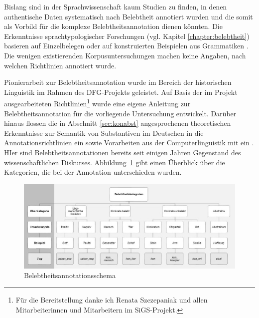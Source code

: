 
Bislang sind in der Sprachwissenschaft kaum Studien zu finden, in denen authentische Daten systematisch nach Belebtheit annotiert wurden und die somit als Vorbild für die komplexe  Belebtheitsannotation dienen könnten. Die Erkenntnisse sprachtypologischer Forschungen (vgl. Kapitel \ref{chapter:belebtheit}) basieren auf Einzelbelegen oder auf konstruierten Beispielen aus Grammatiken \parencite[z.B.][]{Comrie1989,Corbett2000,Aissen2003}. Die wenigen existierenden Korpusuntersuchungen  \parencite{Dahl1996,Yamamoto1999} machen keine Angaben, nach welchen Richtlinien annotiert wurde.

Pionierarbeit zur Belebtheitsannotation wurde im Bereich der historischen Linguistik im Rahmen des DFG-Projekts  \parencite[vgl.][]{Szczepaniak2016} geleistet. Auf Basis der im Projekt ausgearbeiteten Richtlinien\footnote{Für die Bereitstellung danke ich Renata Szczepaniak und allen Mitarbeiterinnen und Mitarbeitern im SiGS-Projekt.} wurde eine eigene Anleitung zur Belebtheitsannotation für die vorliegende Untersuchung entwickelt. Darüber hinaus flossen die in Abschnitt \ref{sec:konabst} angesprochenen theoretischen Erkenntnisse zur Semantik von Substantiven im Deutschen \parencite[u.a.][]{Ewald1992,Studler2011} in die Annotationsrichtlinien ein sowie  Vorarbeiten aus der Computerlinguistik mit ein \parencite[vgl.][]{Garretson2004,Zaenen2004,Ovrelid2009}. HIer sind Belebtheitsannotationen bereits seit einigen Jahren Gegenstand des wissenschaftlichen Diskurses. Abbildung~\ref{abb:belebtheitsannotationsschema} gibt einen Überblick über die Kategorien, die bei der Annotation unterschieden wurden.

\begin{figure}[h]
\begin{center}
  \includegraphics[width=12 cm]{images/annotationsschema-belebtheit-sw.jpg}
\caption {Belebtheitsannotationsschema}
\label{abb:belebtheitsannotationsschema}
\end{center}
\end{figure} 

